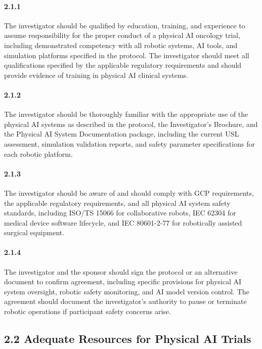 \documentclass[11pt]{article}
\begin{document}
\paragraph{2.1.1} The investigator should be qualified by education, training, and experience to assume responsibility for the proper conduct of a physical AI oncology trial, including demonstrated competency with all robotic systems, AI tools, and simulation platforms specified in the protocol. The investigator should meet all qualifications specified by the applicable regulatory requirements and should provide evidence of training in physical AI clinical systems.

\paragraph{2.1.2} The investigator should be thoroughly familiar with the appropriate use of the physical AI systems as described in the protocol, the Investigator's Brochure, and the Physical AI System Documentation package, including the current USL assessment, simulation validation reports, and safety parameter specifications for each robotic platform.

\paragraph{2.1.3} The investigator should be aware of and should comply with GCP requirements, the applicable regulatory requirements, and all physical AI system safety standards, including ISO/TS 15066 for collaborative robots, IEC 62304 for medical device software lifecycle, and IEC 80601-2-77 for robotically assisted surgical equipment.

\paragraph{2.1.4} The investigator and the sponsor should sign the protocol or an alternative document to confirm agreement, including specific provisions for physical AI system oversight, robotic safety monitoring, and AI model version control. The agreement should document the investigator's authority to pause or terminate robotic operations if participant safety concerns arise.

\subsection{2.2 Adequate Resources for Physical AI Trials}
\end{document}
